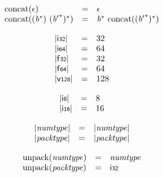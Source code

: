 \vspace{1ex}

$$
\begin{array}{@{}lcl@{}l@{}}
{\mathrm{concat}}(\epsilon) &=& \epsilon &  \\
{\mathrm{concat}}(({{\mathit{b}}^\ast})~{({{\mathit{b}'}^\ast})^\ast}) &=& {{\mathit{b}}^\ast}~{\mathrm{concat}}({({{\mathit{b}'}^\ast})^\ast}) &  \\
\end{array}
$$

\vspace{1ex}

\vspace{1ex}

\vspace{1ex}

$$
\begin{array}{@{}lcl@{}l@{}}
{|\mathsf{i{\scriptstyle32}}|} &=& 32 &  \\
{|\mathsf{i{\scriptstyle64}}|} &=& 64 &  \\
{|\mathsf{f{\scriptstyle32}}|} &=& 32 &  \\
{|\mathsf{f{\scriptstyle64}}|} &=& 64 &  \\
{|\mathsf{v{\scriptstyle128}}|} &=& 128 &  \\
\end{array}
$$

$$
\begin{array}{@{}lcl@{}l@{}}
{|\mathsf{i{\scriptstyle8}}|} &=& 8 &  \\
{|\mathsf{i{\scriptstyle16}}|} &=& 16 &  \\
\end{array}
$$

$$
\begin{array}{@{}lcl@{}l@{}}
{|{\mathit{numtype}}|} &=& {|{\mathit{numtype}}|} &  \\
{|{\mathit{packtype}}|} &=& {|{\mathit{packtype}}|} &  \\
\end{array}
$$

\vspace{1ex}

$$
\begin{array}{@{}lcl@{}l@{}}
{\mathrm{unpack}}({\mathit{numtype}}) &=& {\mathit{numtype}} &  \\
{\mathrm{unpack}}({\mathit{packtype}}) &=& \mathsf{i{\scriptstyle32}} &  \\
\end{array}
$$

\vspace{1ex}

